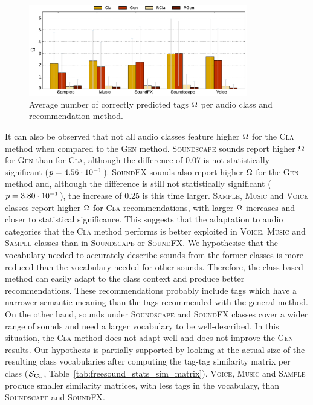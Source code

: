 \begin{figure}
  \centering
  \includegraphics[width=0.85\textwidth]{ch04_class/pics/fig_AT_per_sound_category_per_method.pdf}
  \caption[Average number of correctly predicted tags per audio class and recommendation method]{Average number of correctly predicted tags $\Omega$ per audio class and recommendation method.}
  \label{class:fig:accepted_tags_per_category_per_method}
\end{figure}

It can also be observed that not all audio classes feature higher $\Omega$ for the \textsc{Cla} method when compared to the \textsc{Gen} method. \textsc{Soundscape} sounds report higher $\Omega$ for \textsc{Gen} than for \textsc{Cla}, although the difference of 0.07 is not statistically significant ($p = 4.56\cdot 10^{-1}$). \textsc{SoundFX} sounds also report higher $\Omega$ for the \textsc{Gen} method and, although the difference is still not statistically significant ($p = 3.80\cdot 10^{-1}$), the increase of 0.25 is this time larger. \textsc{Sample}, \textsc{Music} and \textsc{Voice} classes report higher $\Omega$ for \textsc{Cla} recommendations, with larger $\Omega$ increases and closer to statistical significance. This suggests that the adaptation to audio categories that the \textsc{Cla} method performs is better exploited in \textsc{Voice}, \textsc{Music} and \textsc{Sample} classes than in \textsc{Soundscape} or \textsc{SoundFX}. We hypothesise that the vocabulary needed to accurately describe sounds from the former classes is more reduced than the vocabulary needed for other sounds. 
Therefore, the class-based method can easily adapt to the class context and produce better recommendations.
These recommendations probably include tags which have a narrower semantic meaning than the tags recommended with the general method.
On the other hand, sounds under \textsc{Soundscape} and \textsc{SoundFX} classes cover a wider range of sounds and need a larger vocabulary to be well-described. In this situation, the \textsc{Cla} method does not adapt well and does not improve the  \textsc{Gen} results. Our hypothesis is partially supported by looking at the actual size of the resulting class vocabularies after computing the tag-tag similarity matrix per class ($\mathcal{S}_{\mathbf{C}_{h}}$, Table~\ref{tab:freesound_stats_sim_matrix}). \textsc{Voice}, \textsc{Music} and \textsc{Sample} produce smaller similarity matrices, with less tags in the vocabulary, than \textsc{Soundscape} and \textsc{SoundFX}.


